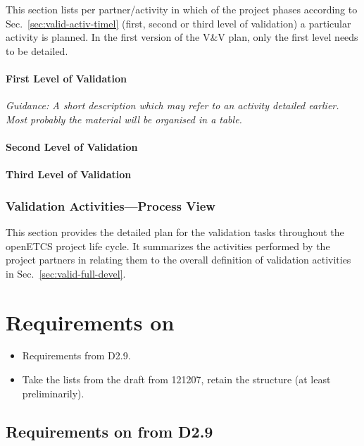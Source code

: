 \documentclass{template/openetcs_report}
\begin{document}
This section lists per partner/activity in which of the project
phases according to Sec.~\ref{sec:valid-activ-timel} (first, second or
third level of validation) a particular activity is planned. In the
first version of the V\&V plan, only the first level needs to be detailed.


\subsubsection{First Level of Validation}
\label{sec:first-level-valid}

\emph{Guidance: A short description which may refer to an activity
  detailed earlier. Most probably the material will be organised in a table.}

\subsubsection{Second Level of Validation}
\label{sec:secon-level-valid}

\subsubsection{Third Level of Validation}
\label{sec:third-level-valid}


\subsection{Validation Activities---Process View}
\label{sec:valid-activ-proce}
This section provides the detailed plan for the validation tasks
throughout the openETCS project life cycle. It summarizes the
activities performed by the project partners in relating them to the
overall definition of validation activities in
Sec.~\ref{sec:valid-full-devel}. 


\appendix
\chapter{Requirements on \VV}
\label{sec:appendix}

{\it
  \begin{itemize}
  \item Requirements from D2.9.
  \item Take the lists from the draft from 121207, retain the structure (at
    least preliminarily). 
  \end{itemize}
}

\section{Requirements on \VV from D2.9}
\label{sec:requirements-vv-D29}
\end{document}
